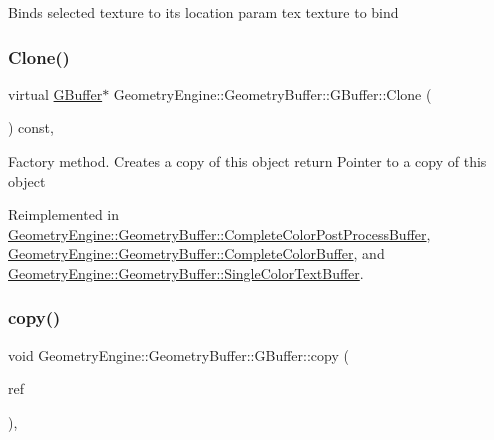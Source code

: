 Binds selected texture to its location param tex texture to bind \mbox{\label{class_geometry_engine_1_1_geometry_buffer_1_1_g_buffer_af993f8c23f7e78051f3071be4873af9d}} 
\subsubsection{\texorpdfstring{Clone()}{Clone()}}
{\footnotesize\ttfamily virtual \mbox{\hyperlink{class_geometry_engine_1_1_geometry_buffer_1_1_g_buffer}{G\+Buffer}}$\ast$ Geometry\+Engine\+::\+Geometry\+Buffer\+::\+G\+Buffer\+::\+Clone (\begin{DoxyParamCaption}{ }\end{DoxyParamCaption}) const\hspace{0.3cm}{\ttfamily [inline]}, {\ttfamily [virtual]}}

Factory method. Creates a copy of this object return Pointer to a copy of this object 

Reimplemented in \mbox{\hyperlink{class_geometry_engine_1_1_geometry_buffer_1_1_complete_color_post_process_buffer_a8a484d5196bba7b92f31e500229743bc}{Geometry\+Engine\+::\+Geometry\+Buffer\+::\+Complete\+Color\+Post\+Process\+Buffer}}, \mbox{\hyperlink{class_geometry_engine_1_1_geometry_buffer_1_1_complete_color_buffer_a56aee74c7523f0b16fd8b97c8c44f84f}{Geometry\+Engine\+::\+Geometry\+Buffer\+::\+Complete\+Color\+Buffer}}, and \mbox{\hyperlink{class_geometry_engine_1_1_geometry_buffer_1_1_single_color_text_buffer_add00c2857f9d425600ef83d50a9c8019}{Geometry\+Engine\+::\+Geometry\+Buffer\+::\+Single\+Color\+Text\+Buffer}}.

\mbox{\label{class_geometry_engine_1_1_geometry_buffer_1_1_g_buffer_a9f20eb78703ef048d59a54f90ee09f25}} 
\subsubsection{\texorpdfstring{copy()}{copy()}}
{\footnotesize\ttfamily void Geometry\+Engine\+::\+Geometry\+Buffer\+::\+G\+Buffer\+::copy (\begin{DoxyParamCaption}\item[{const \mbox{\hyperlink{class_geometry_engine_1_1_geometry_buffer_1_1_g_buffer}{G\+Buffer}} \&}]{ref }\end{DoxyParamCaption})\hspace{0.3cm}{\ttfamily [protected]}, {\ttfamily [virtual]}}

